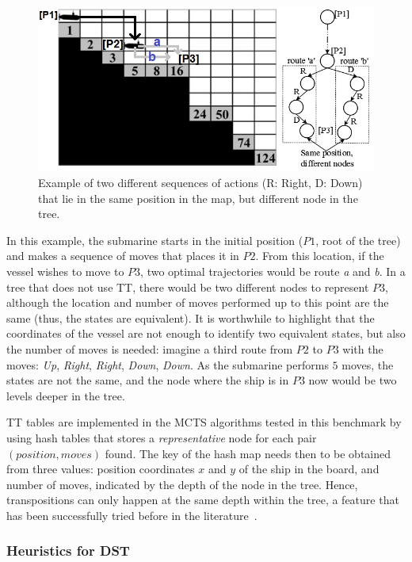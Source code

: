 \documentclass[journal]{IEEEtran}
\begin{document}
\begin{figure}[!t]
\begin{center}
\includegraphics[width=0.9\columnwidth]{img/dstTransTables}
\end{center}
\caption{Example of two different sequences of actions (R: Right, D: Down) that lie in the same position in the map, but different node in the tree.}
\label{fig:dstTable}
\end{figure}

In this example, the submarine starts in the initial position ($P1$, root of the tree) and makes a sequence of moves that places it in $P2$. From this location, if the vessel wishes to move to $P3$, two optimal trajectories would be route \textit{a} and \textit{b}. In a tree that does not use TT, there would be two different nodes to represent $P3$, although the location and number of moves performed up to this point are the same (thus, the states are equivalent). It is worthwhile to highlight that the coordinates of the vessel are not enough to identify two equivalent states, but also the number of moves is needed: imagine a third route from $P2$ to $P3$ with the moves: \textit{Up}, \textit{Right}, \textit{Right}, \textit{Down}, \textit{Down}. As the submarine performs $5$ moves, the states are not the same, and the node where the ship is in $P3$ now would be two levels deeper in the tree.

TT tables are implemented in the MCTS algorithms tested in this benchmark by using hash tables that stores a \textit{representative} node for each pair $(position, moves)$ found.  The key of the hash map needs then to be obtained from three values: position coordinates $x$ and $y$ of the ship in the board, and number of moves, indicated by the depth of the node in the tree. Hence, transpositions can only happen at the same depth within the tree, a feature that has been successfully tried before in the literature~\cite{Kozelek2009}.

\subsubsection{Heuristics for DST} \label{sssec:heurDST}
\end{document}
